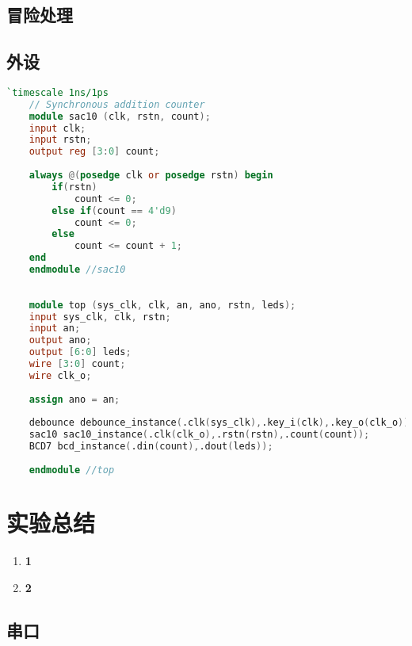 \documentclass[a4paper]{article}
\begin{document}
\subsection{冒险处理}

\subsection{外设}

\begin{lstlisting}[language=Verilog]      
    `timescale 1ns/1ps
    // Synchronous addition counter
    module sac10 (clk, rstn, count);
    input clk;
    input rstn;
    output reg [3:0] count;
    
    always @(posedge clk or posedge rstn) begin
        if(rstn)
            count <= 0;
        else if(count == 4'd9)
            count <= 0;
        else
            count <= count + 1;
    end
    endmodule //sac10
    
    
    module top (sys_clk, clk, an, ano, rstn, leds);
    input sys_clk, clk, rstn;
    input an;
    output ano;
    output [6:0] leds;
    wire [3:0] count;
    wire clk_o;
    
    assign ano = an;
    
    debounce debounce_instance(.clk(sys_clk),.key_i(clk),.key_o(clk_o));
    sac10 sac10_instance(.clk(clk_o),.rstn(rstn),.count(count));
    BCD7 bcd_instance(.din(count),.dout(leds));
    
    endmodule //top
\end{lstlisting}
    

\section{实验总结}
\begin{enumerate}
    \item \textbf{1}
    \item \textbf{2}
\end{enumerate}
    
\subsection{串口}

\newpage

\appendix
\end{document}
